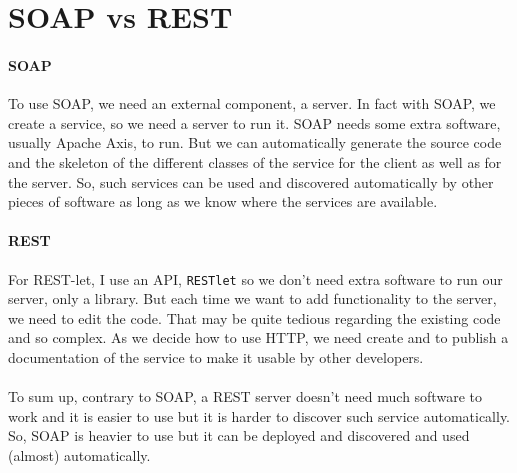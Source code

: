 \section{SOAP vs REST}

\paragraph{SOAP}{
    To use SOAP, we need an external component, a server. In fact with SOAP,
 we create a service, so we need a server to run it. SOAP needs some extra
 software, usually Apache Axis, to run. But we can automatically generate
 the source code and the skeleton of the different classes of the service
 for the client as well as for the server. So, such services can be used
 and discovered automatically by other pieces of software as long as we
 know where the services are available.
}

\paragraph{REST}{
    For REST-let, I use an API, \texttt{RESTlet} so we don't need extra
 software to run our server, only a library. But each time we want to
 add functionality to the server, we need to edit the code. That may
 be quite tedious regarding the existing code and so complex. As we decide
 how to use HTTP, we need create and to publish a documentation of the service
 to make it usable by other developers.
}

\paragraph{}{
    To sum up, contrary to SOAP, a REST server doesn't need much software
 to work and it is easier to use but it is harder to discover such service
 automatically. So, SOAP is heavier to use but it can be deployed and discovered
 and used (almost) automatically.
}
